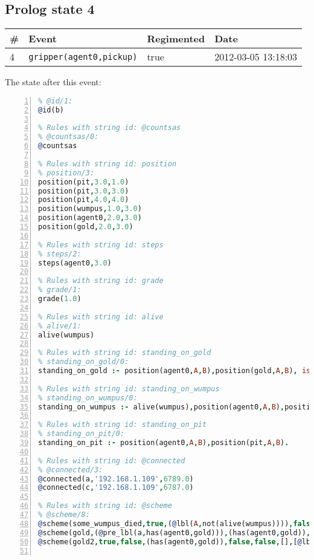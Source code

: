 \documentclass[11pt]{article}\usepackage[utf8]{inputenc}\usepackage{geometry}
\begin{document}
\subsection{Prolog state 4}
\begin{table}[ht]
\centering 
\begin{tabular}{l l l l} 
\textbf{\#} & \textbf{Event} & \textbf{Regimented} & \textbf{Date} \\ [0.5ex] 
\hline
4&\texttt{gripper(agent0,pickup)}&true&2012-03-05 13:18:03\\ [1ex] \hline\end{tabular}
\end{table}
The state after this event:

\lstset{breaklines=true}\begin{lstlisting}[language=Prolog, numbers=left]
% Rules with string id: @id
% @id/1:
@id(b)

% Rules with string id: @countsas
% @countsas/0:
@countsas

% Rules with string id: position
% position/3:
position(pit,3.0,1.0)
position(pit,3.0,3.0)
position(pit,4.0,4.0)
position(wumpus,1.0,3.0)
position(agent0,2.0,3.0)
position(gold,2.0,3.0)

% Rules with string id: steps
% steps/2:
steps(agent0,3.0)

% Rules with string id: grade
% grade/1:
grade(1.0)

% Rules with string id: alive
% alive/1:
alive(wumpus)

% Rules with string id: standing_on_gold
% standing_on_gold/0:
standing_on_gold :- position(agent0,A,B),position(gold,A,B), is (C,+(A,B)),>(C,2.0).

% Rules with string id: standing_on_wumpus
% standing_on_wumpus/0:
standing_on_wumpus :- alive(wumpus),position(agent0,A,B),position(wumpus,A,B).

% Rules with string id: standing_on_pit
% standing_on_pit/0:
standing_on_pit :- position(agent0,A,B),position(pit,A,B).

% Rules with string id: @connected
% @connected/3:
@connected(a,'192.168.1.109',6789.0)
@connected(c,'192.168.1.109',6787.0)

% Rules with string id: @scheme
% @scheme/8:
@scheme(some_wumpus_died,true,(@lbl(A,not(alive(wumpus)))),false,false,false,[update(bombard_wumpus)|[]],[])
@scheme(gold,(@pre_lbl(a,has(agent0,gold))),(has(agent0,gold)),false,(@lbl(a,not(has(agent0,gold)))),false,[update(force_drop)|[]],[])
@scheme(gold2,true,false,(has(agent0,gold)),false,false,[],[@lbl(c,update(bombard_wumpus))|[]])


\end{lstlisting}
\end{document}
